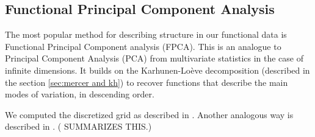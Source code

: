 \subsection{Functional Principal Component Analysis}
\label{sec:fpca}
The most popular method for describing structure in our functional data is Functional
Principal Component analysis (FPCA). This is an analogue to Principal Component Analysis
(PCA) from multivariate statistics in the case of infinite dimensions. It builds on the
Karhunen-Loève decomposition (described in the section \ref{sec:mercer and kh}) to
recover functions that describe the main modes of variation, in descending order.

We computed the discretized grid as described in \citet[Chapter~8.4.1]{RamsaySilverman2005}. Another analogous way
is described in \textcite{KneipUtikal2001}. (\textcite{Delicado2011} SUMMARIZES THIS.)
